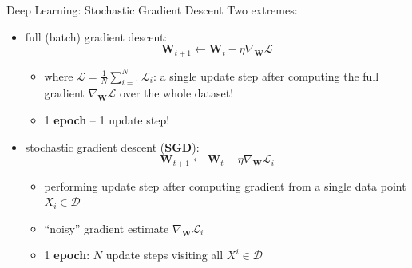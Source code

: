 \begin{frame}{Deep Learning: Stochastic Gradient Descent}
\protect\hypertarget{deep-learning-stochastic-gradient-descent}{}
Two extremes:

\begin{itemize}
\tightlist
\item
  full (batch) gradient descent:
  \[ \mathbf{W}_{t+1} \leftarrow \mathbf{W}_t - \eta \nabla_\mathbf{W} \mathcal{L} \]

  \begin{itemize}
  \tightlist
  \item
    where \(\mathcal{L} = \frac{1}{N} {\sum_{i=1}^{N} \mathcal{L}_i}\):
    a single update step after computing the full gradient
    \(\nabla_\mathbf{W} \mathcal{L}\) over the whole dataset!
  \item
    1 \textbf{epoch} -- 1 update step!
  \end{itemize}
\item
  stochastic gradient descent (\textbf{SGD}):
  \[ \mathbf{W}_{t+1} \leftarrow \mathbf{W}_t - \eta \nabla_\mathbf{W} \mathcal{L}_i \]

  \begin{itemize}
  \tightlist
  \item
    performing update step after computing gradient from a single data
    point \(X_i \in \mathcal{D}\)
  \item
    ``noisy'' gradient estimate \(\nabla_\mathbf{W} \mathcal{L}_i\)
  \item
    1 \textbf{epoch}: \(N\) update steps visiting all
    \(X^i \in \mathcal{D}\)
  \end{itemize}
\end{itemize}

\end{frame}

